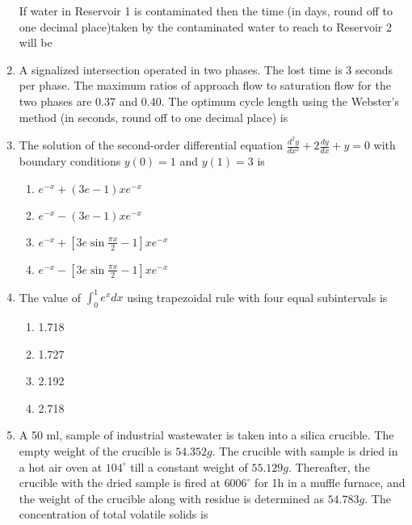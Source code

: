 \documentclass[journal]{IEEEtran}
\begin{document}
\begin{enumerate}
If water in Reservoir 1 is contaminated then the time (in days, round off to one decimal place)taken by the contaminated water to reach to Reservoir 2 will be \underline{\hspace{1cm}}
\vspace{0.5cm}
\item A signalized intersection operated in two phases. The lost time is 3 seconds per phase. The maximum ratios of approach flow to saturation flow for the two phases are 0.37 and 0.40. The optimum cycle length using the Webster's method (in seconds, round off to one decimal place) is \underline{\hspace{1cm}}
\vspace{0.5cm}
\item The solution of the second-order differential equation $\frac{d^2y}{dx^2}+2\frac{dy}{dx}+y=0$ with boundary conditions $y(0)=1$ and $y(1)=3$ is 
\begin{enumerate}
    \item $e^{-x}+(3e-1)xe^{-x}$
    \item $e^{-x}-(3e-1)xe^{-x}$
    \item $e^{-x}+[3e\sin{\frac{\pi x}{2}}-1]xe^{-x}$
    \item $e^{-x}-[3e\sin{\frac{\pi x}{2}}-1]xe^{-x}$
\end{enumerate}
\item The value of $\int_{0}^1 e^x dx$ using trapezoidal rule with four equal subintervals is 
\begin{enumerate}
    \item 1.718
    \item 1.727
    \item 2.192
    \item 2.718
\end{enumerate}  
\vspace{0.5cm}
\item A 50 ml, sample of industrial wastewater is taken into a silica crucible. The empty weight of the crucible is $54.352g$. The crucible with sample is dried in a hot air oven at $104^\circ$ till a constant weight of $55.129g$. Thereafter, the crucible with the dried sample is fired at $6006^\circ$ for 1h in a muffle furnace, and the weight of the crucible along with residue is determined as $54.783g$. The concentration of total volatile solids is \underline{\hspace{1cm}}

\end{enumerate}
\end{document}
